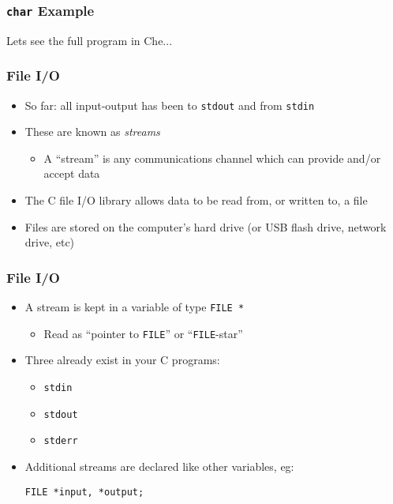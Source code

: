 \documentclass[14pt]{beamer}
\begin{document}
\begin{frame}
\frametitle{\texttt{char} Example}
\begin{center}
Lets see the full program in Che...
\end{center}
\end{frame}

\begin{frame}
\frametitle{File I/O}
\begin{itemize}
\item So far: all input-output has been to \texttt{stdout} and from \texttt{stdin}
\item These are known as \textit{streams}
	\begin{itemize}
		\item A ``stream'' is any communications channel which can provide and/or accept data
	\end{itemize}
\item The C file I/O library allows data to be read from, or written to, a file
\item Files are stored on the computer's hard drive (or USB flash drive, network drive, etc)
\end{itemize}
\end{frame}

\begin{frame}[fragile]
\frametitle{File I/O}
\begin{itemize}
\item A stream is kept in a variable of type \texttt{FILE~*}
	\begin{itemize}
		\item Read as ``pointer to \texttt{FILE}'' or ``\texttt{FILE}-star''
	\end{itemize}
\item Three already exist in your C programs:
	\begin{itemize}
		\item \texttt{stdin}
		\item \texttt{stdout}
		\item \texttt{stderr}
	\end{itemize}
\item Additional streams are declared like other variables, eg:
\begin{lstlisting}[style=CStyle]
FILE *input, *output;
\end{lstlisting}
\end{itemize}
\end{frame}
\end{document}
